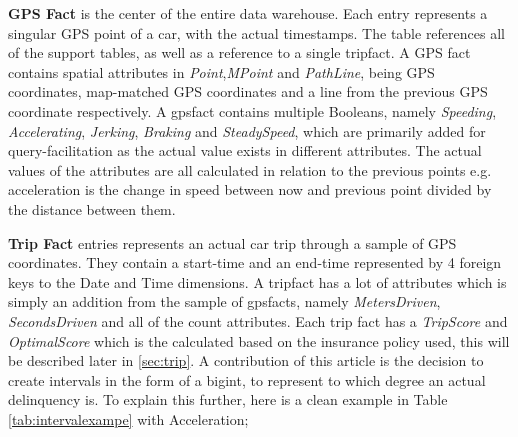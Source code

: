 \textbf{GPS Fact} is the center of the entire data warehouse. Each entry represents a singular GPS point of a car, with the actual timestamps. The table references all of the support tables, as well as a reference to a single tripfact. A GPS fact contains spatial attributes in \textit{Point},\textit{MPoint} and \textit{PathLine}, being GPS coordinates, map-matched GPS coordinates and a line from the previous GPS coordinate respectively. A gpsfact contains multiple Booleans, namely \textit{Speeding}, \textit{Accelerating}, \textit{Jerking}, \textit{Braking} and \textit{SteadySpeed}, which are primarily added for query-facilitation as the actual value exists in different attributes. The actual values of the attributes are all calculated in relation to the previous points e.g. acceleration is the change in speed between now and previous point divided by the distance between them.

\textbf{Trip Fact} entries represents an actual car trip through a sample of GPS coordinates. They contain a start-time and an end-time represented by 4 foreign keys to the Date and Time dimensions. A tripfact has a lot of attributes which is simply an addition from the sample of gpsfacts, namely \textit{MetersDriven}, \textit{SecondsDriven} and all of the count attributes. Each trip fact has a \textit{TripScore} and \textit{OptimalScore} which is the calculated based on the insurance policy used, this will be described later in \ref{sec:trip}. A contribution of this article is the decision to create intervals in the form of a bigint, to represent to which degree an actual delinquency is. To explain this further, here is a clean example in Table \ref{tab:intervalexampe} with Acceleration; 

